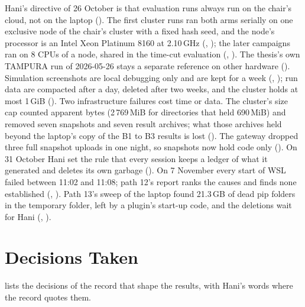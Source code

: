 Hani's directive of 26 October is that evaluation runs always run on the chair's
cloud, not on the laptop (). The first cluster runs ran both arms serially on
one exclusive node of the chair's cluster with a fixed hash seed, and the node's
processor is an Intel Xeon Platinum 8160 at 2.10\,GHz (, ); the later
campaigns ran on 8 CPUs of a node, shared in the time-cut evaluation (,
). The thesis's own TAMPURA run of
2026-05-26 stays a separate reference on other hardware (). Simulation
screenshots are local debugging only and are kept for a week (, );
run data are compacted after a day, deleted after two weeks, and the cluster holds
at most 1\,GiB (). Two infrastructure failures cost time or data. The
cluster's size cap counted apparent bytes (2\,769\,MiB for directories that held
690\,MiB) and removed seven snapshots and seven result archives; what those archives
held beyond the laptop's copy of the B1 to B3 results is lost (). The gateway
dropped three full snapshot uploads in one night, so snapshots now hold code only
(). On 31 October Hani set the rule that every session keeps a ledger of what
it generated and deletes its own garbage (). On 7 November every start of WSL
failed between 11:02 and 11:08; path 12's report ranks the causes and finds none
established (, ). Path 13's sweep of the laptop found 21.3\,GB
of dead pip folders in the temporary folder, left by a plugin's start-up code, and the
deletions wait for Hani (, ).

\section{Decisions Taken}
\label{sec:decisions}

 lists the decisions of the record that shape the results, with
Hani's words where the record quotes them.

